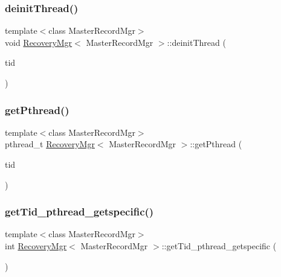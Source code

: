 \subsubsection{\texorpdfstring{deinit\+Thread()}{deinitThread()}}
{\footnotesize\ttfamily template$<$class Master\+Record\+Mgr$>$ \\
void \hyperlink{classRecoveryMgr}{Recovery\+Mgr}$<$ Master\+Record\+Mgr $>$\+::deinit\+Thread (\begin{DoxyParamCaption}\item[{const int}]{tid }\end{DoxyParamCaption})\hspace{0.3cm}{\ttfamily [inline]}}

\mbox{\label{classRecoveryMgr_a9f8a5b27b63e5d1c51c31f7bdec75242}} 
\subsubsection{\texorpdfstring{get\+Pthread()}{getPthread()}}
{\footnotesize\ttfamily template$<$class Master\+Record\+Mgr$>$ \\
pthread\+\_\+t \hyperlink{classRecoveryMgr}{Recovery\+Mgr}$<$ Master\+Record\+Mgr $>$\+::get\+Pthread (\begin{DoxyParamCaption}\item[{const int}]{tid }\end{DoxyParamCaption})\hspace{0.3cm}{\ttfamily [inline]}}

\mbox{\label{classRecoveryMgr_a6c6f9170e844cb0a600b10ebf3ea6e37}} 
\subsubsection{\texorpdfstring{get\+Tid\+\_\+pthread\+\_\+getspecific()}{getTid\_pthread\_getspecific()}}
{\footnotesize\ttfamily template$<$class Master\+Record\+Mgr$>$ \\
int \hyperlink{classRecoveryMgr}{Recovery\+Mgr}$<$ Master\+Record\+Mgr $>$\+::get\+Tid\+\_\+pthread\+\_\+getspecific (\begin{DoxyParamCaption}{ }\end{DoxyParamCaption})\hspace{0.3cm}{\ttfamily [inline]}}

